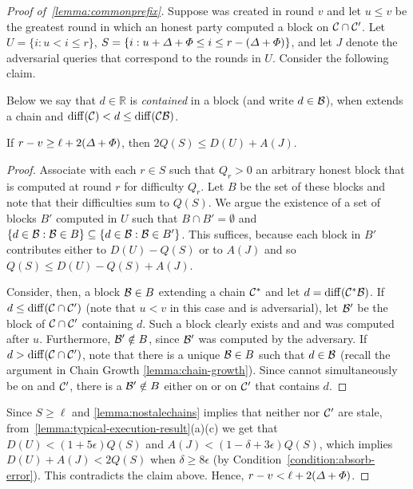 \begin{proof}[Proof of~\cref{lemma:commonprefix}]
    Suppose  was created in round $v$ and let
    $u \le v$ be the greatest round in which an honest party computed a block on
    $\mathcal{C} \cap \mathcal{C}'$.
    Let $U = \{i : u < i \le r \}$, $S = \{i : u + \varDelta + \varPhi \le i \le r - (\varDelta + \varPhi) \}$, and let $J$ denote the adversarial queries that correspond to the rounds in $U$. Consider the following claim.

    Below we say that $d \in \mathbb{R}$ is \emph{contained} in a block \block (and write $d \in \mathcal{B}$), when \block extends a chain \chain and $\mathrm{diff}(\mathcal{C}) < d \le \mathrm{diff}(\mathcal{C} \mathcal{B})$.

    \begin{claim*}
        If $r - v \ge \ell + 2(\varDelta + \varPhi)$, then $2Q(S) \le D(U) + A(J)$.
    \end{claim*}

    \begin{proof}
        Associate with each $r \in S$ such that $Q_r > 0$ an arbitrary honest block that is computed at round $r$ for difficulty $Q_r$.
        Let $B$ be the set of these blocks and note that their difficulties sum to $Q(S)$.
        We argue the existence of a set of blocks $B'$ computed in $U$ such that $B \cap B' = \emptyset$ and $\{ d \in \mathcal{B} : \mathcal{B} \in B \} \subseteq \{ d \in \mathcal{B} : \mathcal{B} \in B' \}$.
        This suffices, because each block in $B'$ contributes either to $D(U) - Q(S)$ or to $A(J)$ and so $Q(S) \le D(U) - Q(S) + A(J)$.

        Consider, then, a block $\mathcal{B} \in B$ extending a chain $\mathcal{C}^*$ and let $d = \mathrm{diff}(\mathcal{C}^* \mathcal{B})$. If $d \le \mathrm{diff}(\mathcal{C} \cap \mathcal{C}')$ (note that $u < v$ in this case and  is adversarial), let $\mathcal{B}'$ be the block of $\mathcal{C} \cap \mathcal{C}'$ containing $d$.
        Such a block clearly exists and and was computed after $u$.
        Furthermore, $\mathcal{B}' \notin B$, since $\mathcal{B}'$ was computed by the adversary.
        If $d > \mathrm{diff}(\mathcal{C} \cap \mathcal{C}')$, note that there is a unique $\mathcal{B} \in B$ such that $d \in \mathcal{B}$ (recall the argument in Chain Growth \cref{lemma:chain-growth}).
        Since \block cannot simultaneously be on \chain and $\mathcal{C}'$, there is a $\mathcal{B}' \notin B$ either on \chain or on $\mathcal{C}'$ that contains $d$.
    \end{proof}

    Since $S \ge \ell$ and \cref{lemma:nostalechains} implies that neither \chain nor $\mathcal{C}'$ are stale, from~\cref{lemma:typical-execution-result}(a)(c) we get that $D(U) < (1 + 5\epsilon) Q(S)$ and $A(J) < (1 - \delta + 3\epsilon) Q(S)$, which implies $D(U) + A(J) < 2Q(S)$ when $\delta \ge 8 \epsilon$ (by Condition~\eqref{condition:absorb-error}).
    This contradicts the claim above.
    Hence, $r - v < \ell + 2(\varDelta + \varPhi)$.
\end{proof}
